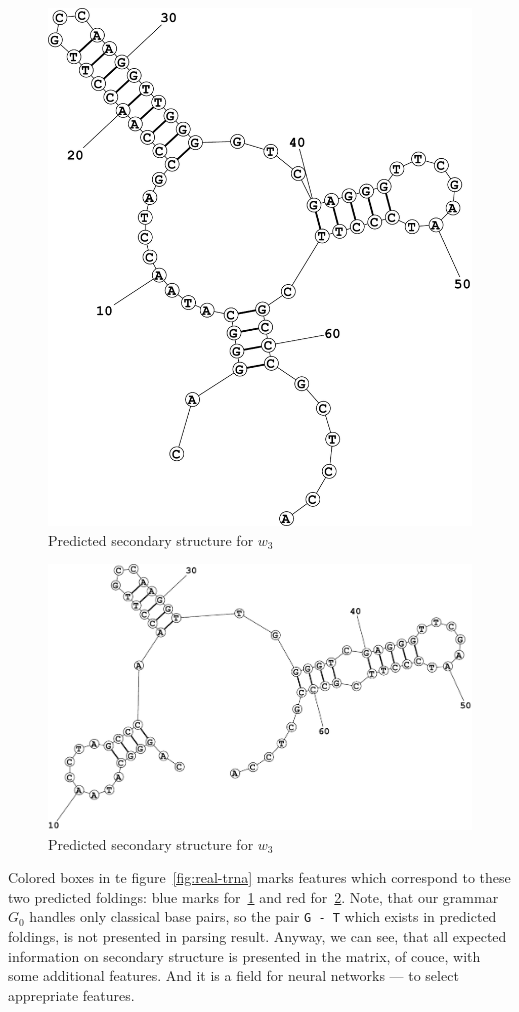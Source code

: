 \documentclass[a4paper,twoside]{article}
\begin{document}
\begin{figure}
\centering
\includegraphics[width=.5\textwidth]{figures/Fold1.pdf}
\caption{Predicted secondary structure for $w_3$}
\label{fig:real-trna-folding1}
\end{figure}


\begin{figure}
\centering
\includegraphics[width=.5\textwidth]{figures/Fold2.pdf}
\caption{Predicted secondary structure for $w_3$}
\label{fig:real-trna-folding2}
\end{figure}

Colored boxes in te figure~\ref{fig:real-trna} marks features which correspond to these two predicted foldings: blue marks for~\ref{fig:real-trna-folding1} and red for~\ref{fig:real-trna-folding2}.
Note, that our grammar $G_0$ handles only classical base pairs, so the pair \verb|G - T| which exists in predicted foldings, is not presented in parsing result.
Anyway, we can see, that all expected information on secondary structure is presented in the matrix, of couce, with some additional features.
And it is a field for neural networks --- to select apprepriate features.
\end{document}
